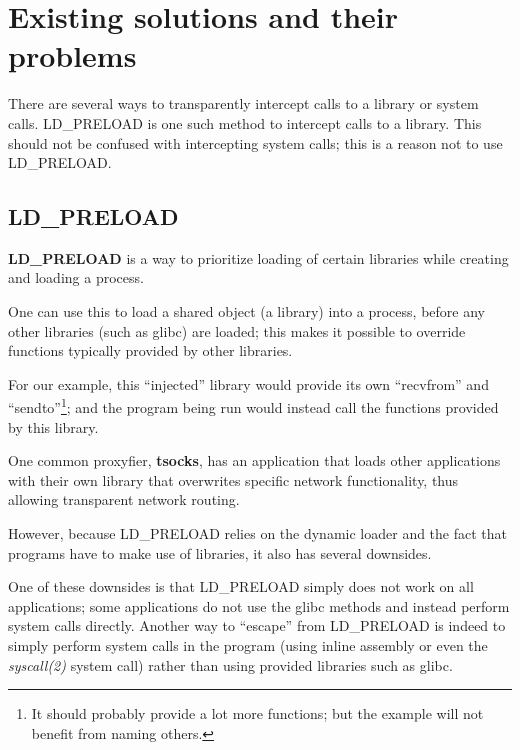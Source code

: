 \documentclass[a4paper, twoside, 10pt, twocolumn]{report}
\begin{document}


%

\section{Existing solutions and their problems}

There are several ways to transparently intercept calls to a library or
system calls. LD\_PRELOAD is one such method to intercept calls to a library.
This should not be confused with intercepting system calls; this is a reason
not to use LD\_PRELOAD.

\subsection{LD\_PRELOAD}

\textbf{LD\_PRELOAD} is a way to prioritize loading of certain libraries
while creating and loading a process.

One can use this to load a shared object (a library) into a process,
before any other libraries (such as glibc) are loaded;
this makes it possible to override functions typically provided by other
libraries.

For our example, this ``injected'' library would provide its own
``recvfrom'' and ``sendto''\footnote{It should probably provide
a lot more functions; but the example will not benefit from naming others.};
and the program being run would instead call the functions provided by
this library.

One common proxyfier, \textbf{tsocks}, has an application that loads
other applications with their own library that overwrites specific
network functionality, thus allowing transparent network routing.

However, because LD\_PRELOAD relies on the dynamic loader and the fact that
programs have to make use of libraries, it also has several downsides.

One of these downsides is that LD\_PRELOAD simply does not work on all
applications; some applications do not use the glibc methods and instead
perform system calls directly. Another way to ``escape'' from LD\_PRELOAD
is indeed to simply perform system calls in the program (using inline assembly
or even the \textit{syscall(2)} system call) rather than using
provided libraries such as glibc.
\end{document}
